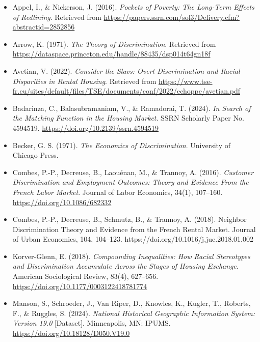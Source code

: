 \documentclass{article}
\begin{document}
\begin{itemize}[label={}]
    \item Appel, I., \& Nickerson, J. (2016). \textit{Pockets of Poverty: The Long-Term Effects of Redlining}. Retrieved from \url{https://papers.ssrn.com/sol3/Delivery.cfm?abstractid=2852856}
    
    \item Arrow, K. (1971). \textit{The Theory of Discrimination}. Retrieved from \url{https://dataspace.princeton.edu/handle/88435/dsp014t64gn18f}
    
    \item Avetian, V. (2022). \textit{Consider the Slavs: Overt Discrimination and Racial Disparities in Rental Housing}. Retrieved from \url{https://www.tse-fr.eu/sites/default/files/TSE/documents/conf/2022/echoppe/avetian.pdf}
    
    \item Badarinza, C., Balasubramaniam, V., \& Ramadorai, T. (2024). \textit{In Search of the Matching Function in the Housing Market}. SSRN Scholarly Paper No. 4594519. \url{https://doi.org/10.2139/ssrn.4594519}
    
    \item Becker, G. S. (1971). \textit{The Economics of Discrimination}. University of Chicago Press.
    
    \item Combes, P.-P., Decreuse, B., Laouénan, M., \& Trannoy, A. (2016). \textit{Customer Discrimination and Employment Outcomes: Theory and Evidence From the French Labor Market}. Journal of Labor Economics, 34(1), 107–160. \url{https://doi.org/10.1086/682332}
    \item Combes, P.-P., Decreuse, B., Schmutz, B., \& Trannoy, A. (2018). Neighbor Discrimination Theory and Evidence from the French Rental Market. Journal of Urban Economics, 104, 104–123. https://doi.org/10.1016/j.jue.2018.01.002
    
    \item Korver-Glenn, E. (2018). \textit{Compounding Inequalities: How Racial Stereotypes and Discrimination Accumulate Across the Stages of Housing Exchange}. American Sociological Review, 83(4), 627–656. \url{https://doi.org/10.1177/0003122418781774}
    
    \item Manson, S., Schroeder, J., Van Riper, D., Knowles, K., Kugler, T., Roberts, F., \& Ruggles, S. (2024). \textit{National Historical Geographic Information System: Version 19.0} [Dataset]. Minneapolis, MN: IPUMS. \url{https://doi.org/10.18128/D050.V19.0}
    

\end{itemize}
\end{document}
